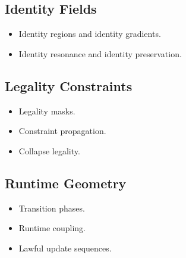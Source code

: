 \subsection{Identity Fields}
\begin{itemize}
    \item Identity regions and identity gradients.
    \item Identity resonance and identity preservation.
\end{itemize}

\subsection{Legality Constraints}
\begin{itemize}
    \item Legality masks.
    \item Constraint propagation.
    \item Collapse legality.
\end{itemize}

\subsection{Runtime Geometry}
\begin{itemize}
    \item Transition phases.
    \item Runtime coupling.
    \item Lawful update sequences.
\end{itemize}
